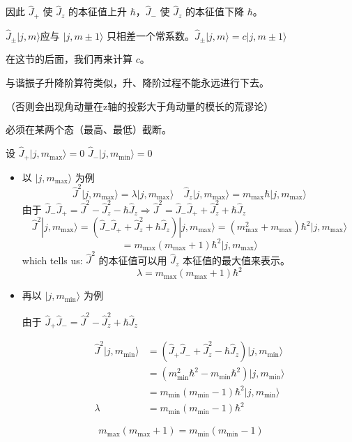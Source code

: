 \documentclass[lang=cn,10pt]{elegantbook}
\begin{document}
因此 \(\hat{J}_+\) 使 \(\hat{J}_z\) 的本征值上升 \(\hbar\)，\(\hat{J}_-\) 使 \(\hat{J}_z\) 的本征值下降 \(\hbar\)。

$\hat{J}_\pm |j, m\rangle $应与 \(|j, m\pm 1\rangle\) 只相差一个常系数。\(\hat{J}_\pm |j, m\rangle = c |j, m\pm 1\rangle\)

在这节的后面，我们再来计算 \(c\)。

与谐振子升降阶算符类似，升、降阶过程不能永远进行下去。

（否则会出现角动量在z轴的投影大于角动量的模长的荒谬论）

必须在某两个态（最高、最低）截断。

设 \(\hat{J}_+ |j, m_{\text{max}}\rangle = 0\) \(\hat{J}_- |j, m_{\text{min}}\rangle = 0\)

\begin{itemize}
	\item 以 \(|j, m_{\text{max}}\rangle\) 为例
	\[
	\hat{J}^2 |j, m_{\text{max}}\rangle = \lambda |j, m_{\text{max}}\rangle \quad \hat{J}_z |j, m_{\text{max}}\rangle = m_{\text{max}} \hbar |j, m_{\text{max}}\rangle
	\]
	由于 \(\hat{J}_- \hat{J}_+ = \hat{J}^2 - \hat{J}_z^2 - \hbar \hat{J}_z \Rightarrow \hat{J}^2 = \hat{J}_- \hat{J}_+ + \hat{J}_z^2 + \hbar \hat{J}_z\)
	\[
	\hat{J}^2 |j, m_{\text{max}}\rangle = (\hat{J}_- \hat{J}_+ + \hat{J}_z^2 + \hbar \hat{J}_z) |j, m_{\text{max}}\rangle = (m_{\text{max}}^2 + m_{\text{max}}) \hbar^2 |j, m_{\text{max}}\rangle
	\]
	\[
	= m_{\text{max}} (m_{\text{max}} + 1) \hbar^2 |j, m_{\text{max}}\rangle
	\]
	which tells us: \(\hat{J}^2\) 的本征值可以用 \(\hat{J}_z\) 本征值的最大值来表示。
	\[
	\lambda = m_{\text{max}} (m_{\text{max}} + 1)\hbar^2
	\]
	
	\item 再以 \(|j, m_{\text{min}}\rangle\) 为例
	
	由于 \(\hat{J}_+ \hat{J}_- = \hat{J}^2-\hat{J}_z^2+\hbar\hat{J}_z\)
	
	\begin{align*}
		\hat{J}^2 |j, m_{\text{min}}\rangle &= (\hat{J}_+ \hat{J}_- + \hat{J}_z^2 - \hbar\hat{J}_z) |j, m_{\text{min}}\rangle \\
		&= (m_{\text{min}}^2 \hbar^2 - m_{\text{min}} \hbar^2) |j, m_{\text{min}}\rangle \\
		&= m_{\text{min}} (m_{\text{min}} - 1) \hbar^2 |j, m_{\text{min}}\rangle \\
		\lambda &= m_{\text{min}} (m_{\text{min}} - 1)\hbar^2
	\end{align*}
\end{itemize}
\[
m_{\text{max}}(m_{\text{max}} + 1) = m_{\text{min}}(m_{\text{min}} - 1)
\]
\end{document}
